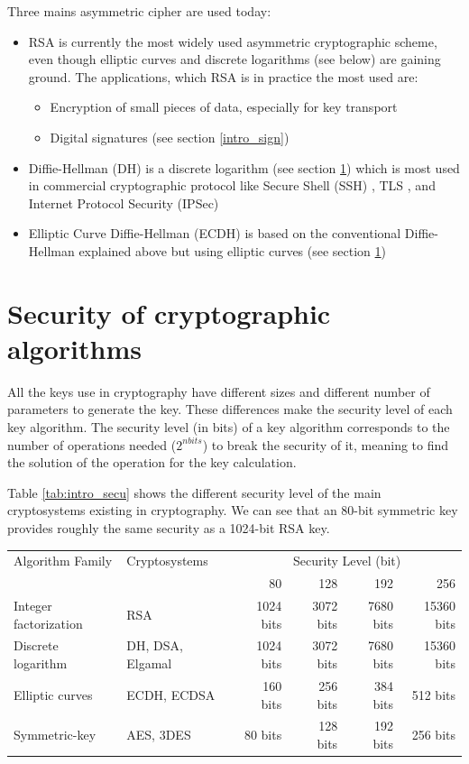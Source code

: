 Three mains asymmetric cipher are used today:
\begin{itemize}
  \item RSA \cite{RFC3447} is currently the most widely used asymmetric
  cryptographic scheme, even though elliptic curves and discrete logarithms (see below) are gaining
  ground. The applications, which RSA is in practice the most used are:
  \begin{itemize}[noitemsep]
    \item Encryption of small pieces of data, especially for key transport
    \item Digital signatures (see section \ref{intro_sign})
  \end{itemize}
  
  \item Diffie-Hellman (DH) is a discrete logarithm (see section
  \ref{intro_secu}) which is most used in commercial cryptographic protocol like
  Secure Shell (SSH) \cite{RFC5647}, TLS \cite{RFC5246}, and Internet Protocol Security
  (IPSec) \cite{RFC3602}
  \item Elliptic Curve Diffie-Hellman (ECDH) is based on the conventional
  Diffie-Hellman explained above but using elliptic curves (see
  section \ref{intro_secu})
\end{itemize}

\section{Security of cryptographic algorithms}
\label{intro_secu}

All the keys use in cryptography have different sizes and different number of
parameters to generate the key.
These differences make the security level of each key algorithm.
The security level (in bits) of a key algorithm corresponds to the number of
operations needed ($2^{nbits}$) to break the security of it, meaning to find the
solution of the operation for the key calculation.

Table \ref{tab:intro_secu} shows the different security level of the main
cryptosystems existing in cryptography. We can see that an 80-bit symmetric key
provides roughly the same security as a 1024-bit RSA key.\newline

\begin{tabular}{|l|l|*{4}{r|}}
 \hline
 Algorithm Family	& Cryptosystems & \multicolumn{4}{|c|}{Security Level (bit)}\\
 					&				& 80 & 128 & 192 & 256 \\
 \hline
 Integer factorization & RSA & 1024	bits & 3072 bits & 7680 bits & 15360 bits \\
 Discrete logarithm & DH, DSA, Elgamal & 1024 bits & 3072 bits & 7680 bits &
 15360 bits \\
 Elliptic curves & ECDH, ECDSA & 160 bits & 256 bits & 384 bits & 512 bits \\
 \hline
 Symmetric-key & AES, 3DES & 80 bits & 128 bits & 192 bits & 256 bits \\
 \hline

\end{tabular}
\label{tab:intro_secu}


